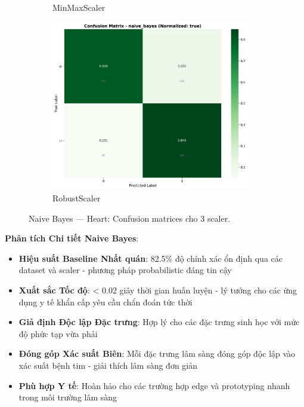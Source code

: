 \begin{figure}[H]
\begin{subfigure}[b]{0.31\textwidth}
\caption{MinMaxScaler}\label{fig:nb_heart_cm_minmax}
\end{subfigure}\hfill
\begin{subfigure}[b]{0.31\textwidth}\centering
\includegraphics[width=0.95\textwidth]{Result/heart_dataset/confusion_matrices/naive_bayes_numeric_dataset_RobustScaler.png}
\caption{RobustScaler}\label{fig:nb_heart_cm_robust}
\end{subfigure}
\caption{Naive Bayes — Heart: Confusion matrices cho 3 scaler.}
\label{fig:nb_heart_confusions}
\end{figure}

\textbf{Phân tích Chi tiết Naive Bayes}:
\begin{itemize}
    \item \textbf{Hiệu suất Baseline Nhất quán}: 82.5\% độ chính xác ổn định qua các dataset và scaler - phương pháp probabilistic đáng tin cậy
    \item \textbf{Xuất sắc Tốc độ}: < 0.02 giây thời gian huấn luyện - lý tưởng cho các ứng dụng y tế khẩn cấp yêu cầu chẩn đoán tức thời
    \item \textbf{Giả định Độc lập Đặc trưng}: Hợp lý cho các đặc trưng sinh học với mức độ phức tạp vừa phải
    \item \textbf{Đóng góp Xác suất Biên}: Mỗi đặc trưng lâm sàng đóng góp độc lập vào xác suất bệnh tim - giải thích lâm sàng đơn giản
    \item \textbf{Phù hợp Y tế}: Hoàn hảo cho các trường hợp edge và prototyping nhanh trong môi trường lâm sàng
\end{itemize}

